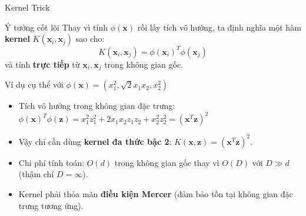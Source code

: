 \begin{frame}{Kernel Trick}
  \begin{block}{Ý tưởng cốt lõi}
    Thay vì tính $\phi(\mathbf{x})$ rồi lấy tích vô hướng, ta định nghĩa một hàm \textbf{kernel} $K(\mathbf{x}_i, \mathbf{x}_j)$ sao cho:
    \[
    K(\mathbf{x}_i, \mathbf{x}_j) = \phi(\mathbf{x}_i)^T \phi(\mathbf{x}_j)
    \]
    và tính \textbf{trực tiếp} từ $\mathbf{x}_i, \mathbf{x}_j$ trong không gian gốc.
  \end{block}

  \begin{exampleblock}{Ví dụ cụ thể với $\phi(\mathbf{x}) = (x_1^2, \sqrt{2}x_1 x_2, x_2^2)$}
    \begin{itemize}
      \item Tích vô hướng trong không gian đặc trưng: $\phi(\mathbf{x})^T \phi(\mathbf{z}) = x_1^2 z_1^2 + 2 x_1 x_2 z_1 z_2 + x_2^2 z_2^2 = (\mathbf{x}^T \mathbf{z})^2$
      \item Vậy chỉ cần dùng \textbf{kernel đa thức bậc 2}: $K(\mathbf{x}, \mathbf{z}) = (\mathbf{x}^T \mathbf{z})^2$.
    \end{itemize}
  \end{exampleblock}

  \begin{itemize}
    \item Chi phí tính toán: $O(d)$ trong không gian gốc thay vì $O(D)$ với $D \gg d$ (thậm chí $D = \infty$).
    \item Kernel phải thỏa mãn \textbf{điều kiện Mercer} (đảm bảo tồn tại không gian đặc trưng tương ứng).
  \end{itemize}
\end{frame}

